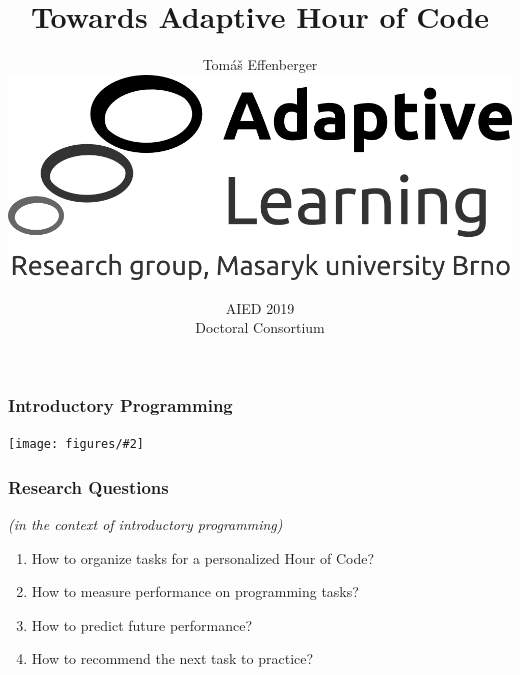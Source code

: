 \documentclass[bigger]{beamer}
\title{Towards Adaptive Hour of Code}
\author{Tom\'a\v{s} Effenberger\\[4mm]
\includegraphics[width=.3\linewidth]{figures/al-logo}\\[6mm]
}
\date{AIED 2019\\Doctoral Consortium}
\newcommand{\img}[2]{
  \begin{center}
    \texttt{[image: figures/\#2]}
  \end{center}
}
\begin{document}
\frame{\titlepage}

\begin{frame}
  \frametitle{Introductory Programming}


  \img{0.6}{robomission-on-yellow-to-left}

\end{frame}


\begin{frame}
  \frametitle{Research Questions}

  \emph{(in the context of introductory programming)}
  \begin{enumerate}
  \item How to organize tasks for a personalized Hour of Code?  %

  \item How to measure performance on programming tasks?

  \item How to predict future performance?

  \item How to recommend the next task to practice?
  \end{enumerate}


\end{frame}
\end{document}
